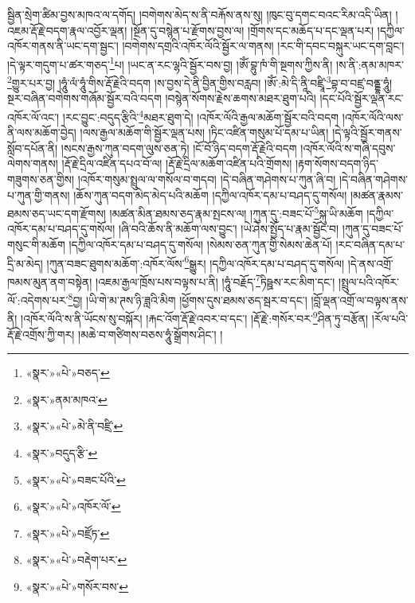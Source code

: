 སྦྱིན་སྲེག་ཚིམ་བྱས་མཁའ་ལ་དགོད། །བགེགས་མེད་ས་ནི་བརྐོས་ནས་སུ། །ཁུང་བུ་དགང་བའང་རིམ་འདི་ཡིན། །འཇམ་རྡོ་རྗེ་བདག་རྣལ་འབྱོར་ལྡན། །སྔོན་དུ་བསྙེན་པ་རྫོགས་བྱས་ལ། །གྲོགས་དང་མཆོད་པ་དང་ལྡན་པར། །དཀྱིལ་འཁོར་གནས་ནི་ཡང་དག་སྦྱང་། །བགེགས་དགྲའི་འཁོར་ལོའི་སྦྱོར་ལ་གནས། །རང་གི་དབང་བསྐུར་ཡང་དག་བླང་། །དེ་ལྟར་གདུག་པ་ཚར་གཅད་\footnote{«སྣར་»«པེ་»བཅད་}པ། །ཡང་ན་རང་ལྷའི་སྦྱོར་བས་བྱ། །ཨོཾ་བྷུ་ཁཾ་གི་སྔགས་ཀྱིས་ནི། །ས་ནི་:ནམ་མཁར་\footnote{«སྣར་»ནམ་མཁའ་}གྱུར་པར་བྱ། །ཧཱུཾ་ལཾ་ཧཱུཾ་གིས་རྡོ་རྗེའི་བདག །ས་བྱས་དེ་ནི་བྱིན་གྱིས་བརླབ། །ཨོཾ་:མེ་དི་ནཱི་བཛྲཱི་\footnote{«སྣར་»«པེ་»མེ་ནི་བཛྲི་}བྷ་བ་བཛྲ་བནྡྷ་ཧཱུཾ། སྔར་བཞིན་བགེགས་གཞོམ་སྦྱོར་བའི་བདག །བསྙེན་སོགས་རྗེས་ཆགས་མཐར་ཐུག་པའི། །དང་པོའི་སྦྱོར་ལྡན་རང་འཁོར་ལོ་འང་། །རང་བྱུང་:བདུད་རྩིའི་\footnote{«སྣར་»བདུད་རྩི་}མཐར་ཐུག་དེ། །འཁོར་ལོའི་རྒྱལ་མཆོག་སྦྱོར་བའི་བདག །འཁོར་ལོའི་ལས་ནི་ལས་མཆོག་བྱེད། །ལས་རྒྱལ་མཆོག་གི་སྦྱོར་ལྡན་པས། །ཏིང་འཛིན་གསུམ་པོ་དམ་པ་ཡིན། །དེ་ལྟའི་སྦྱོར་གནས་སློབ་དཔོན་ནི། །སངས་རྒྱས་ཀུན་བདག་ལུས་ཅན་ཏེ། །ངོ་བོ་ཉིད་བདག་རྡོ་རྗེའི་བདག །འཁོར་ལོའི་ས་གཞི་དབུས་ལེགས་གནས། །རྡོ་རྗེ་དྲིལ་འཛིན་དཔའ་བོ་ལ། །རྡོ་རྗེ་དྲིལ་མཆོག་འཛིན་པའི་གྲོགས། །རྟག་སོགས་བདག་ཉིད་གཟུགས་ཅན་གྱིས། །འཁོར་གསུམ་སྤྲུལ་ལ་གསོལ་བ་གདབ། །དེ་བཞིན་གཤེགས་པ་ཀུན་ཞི་བ། །དེ་བཞིན་གཤེགས་པ་ཀུན་གྱི་གནས། །ཆོས་ཀུན་བདག་མེད་མེད་པའི་མཆོག །དཀྱིལ་འཁོར་དམ་པ་བཤད་དུ་གསོལ། །མཚན་རྣམས་ཐམས་ཅད་ཡང་དག་རྫོགས། །མཚན་མིན་ཐམས་ཅད་རྣམ་སྤངས་ལ། །ཀུན་དུ་:བཟང་པོ་\footnote{«སྣར་»«པེ་»བཟང་པོའི་}སྐུ་ཡི་མཆོག །དཀྱིལ་འཁོར་དམ་པ་བཤད་དུ་གསོལ། །ཞི་བའི་ཆོས་ནི་མཆོག་ལས་བྱུང་། །ཡེ་ཤེས་སྤྱོད་པ་རྣམ་སྦྱོང་བ། །ཀུན་དུ་བཟང་པོ་གསུང་གི་མཆོག །དཀྱིལ་འཁོར་དམ་པ་བཤད་དུ་གསོལ། །སེམས་ཅན་ཀུན་གྱི་སེམས་ཆེན་པོ། །རང་བཞིན་དམ་པ་དྲི་མ་མེད། །ཀུན་བཟང་ཐུགས་མཆོག་:འཁོར་ལོས་\footnote{«སྣར་»«པེ་»འཁོར་ལོ་}སྒྱུར། །དཀྱིལ་འཁོར་དམ་པ་བཤད་དུ་གསོལ། །དེ་ནས་འགྲོ་ཁམས་མུན་ནག་བསྟེན། །འཇམ་རྒྱལ་ཁྲོས་པས་བལྟས་པ་ནི། །ཧཱུཾ་བརྗོད་\footnote{«སྣར་»«པེ་»བཛྲོཏ་}ཏིཥྛས་རང་མིག་དང་། །སྤྲུལ་པའི་འཁོར་ལོ་:འདེགས་པར་\footnote{«སྣར་»«པེ་»བརྡེག་པར་}བྱ། །ཡི་གེ་མ་ཊས་ཉི་ཟླའི་མིག །ཕྱོགས་དུས་ཐམས་ཅད་སྦར་བ་དང་། །བློ་ལྡན་འགྲོ་ལ་བལྟས་ནས་ནི། །འཁོར་ལོའི་ས་ནི་ཡོངས་སུ་བསྐོར། །རྐང་འོག་རྡོ་རྗེ་འབར་བ་དང་། །རྡོ་རྗེ་:གསོར་བར་\footnote{«སྣར་»«པེ་»གསོར་བས་}ཤིན་ཏུ་བརྩོན། །རོལ་པའི་རྡོ་རྗེ་འགྲོས་ཀྱི་གར། །མཆེ་བ་གཙིགས་བཅས་ཧཱུཾ་སྒྲོགས་ཤིང་། །
